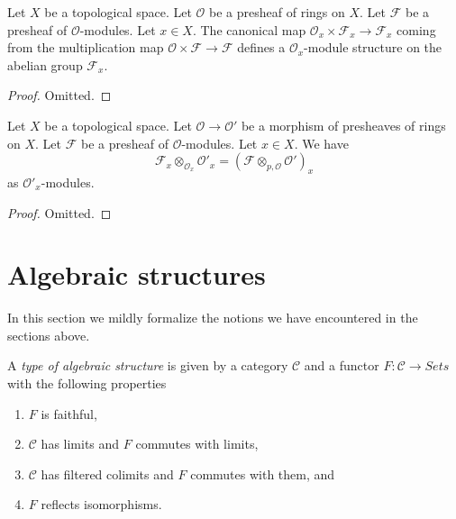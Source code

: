\begin{lemma}
\label{lemma-stalk-module}
Let $X$ be a topological space.
Let $\mathcal{O}$ be a presheaf of rings on $X$.
Let $\mathcal{F}$ be a presheaf of $\mathcal{O}$-modules.
Let $x \in X$.
The canonical map $\mathcal{O}_x \times \mathcal{F}_x
\to \mathcal{F}_x$ coming from the multiplication map
$\mathcal{O} \times \mathcal{F} \to \mathcal{F}$ defines
a $\mathcal{O}_x$-module structure on the abelian group
$\mathcal{F}_x$.
\end{lemma}

\begin{proof}
Omitted.
\end{proof}

\begin{lemma}
\label{lemma-stalk-tensor-presheaf-modules}
Let $X$ be a topological space.
Let $\mathcal{O} \to \mathcal{O}'$ be a morphism of
presheaves of rings on $X$.
Let $\mathcal{F}$ be a presheaf of $\mathcal{O}$-modules.
Let $x \in X$. We have
$$
\mathcal{F}_x \otimes_{\mathcal{O}_x} \mathcal{O}'_x
=
(\mathcal{F} \otimes_{p, \mathcal{O}} \mathcal{O}')_x
$$
as $\mathcal{O}'_x$-modules.
\end{lemma}

\begin{proof}
Omitted.
\end{proof}


\section{Algebraic structures}
\label{section-algebraic-structures}

\noindent
In this section we mildly formalize the notions we have
encountered in the sections above.

\begin{definition}
\label{definition-algebraic-structure}
A {\it type of algebraic structure} is given by a category $\mathcal{C}$
and a functor $F : \mathcal{C} \to \textit{Sets}$ with the
following properties
\begin{enumerate}
\item $F$ is faithful,
\item $\mathcal{C}$ has limits and $F$ commutes with limits,
\item $\mathcal{C}$ has filtered colimits and $F$ commutes with them, and
\item $F$ reflects isomorphisms.
\end{enumerate}
\end{definition}

